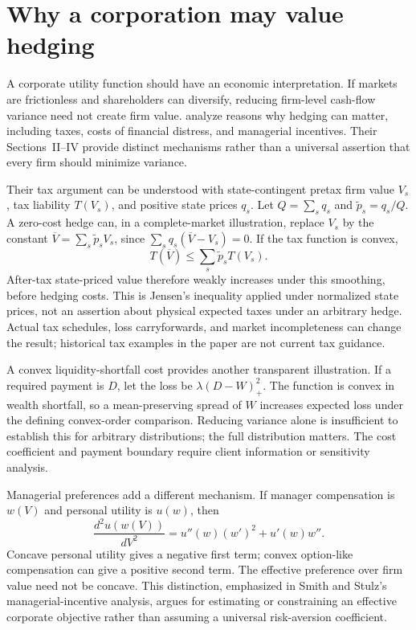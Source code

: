 \section{Why a corporation may value hedging}
A corporate utility function should have an economic interpretation. If markets are frictionless and shareholders can diversify, reducing firm-level cash-flow variance need not create firm value. \citet{smith1985} analyze reasons why hedging can matter, including taxes, costs of financial distress, and managerial incentives. Their Sections~II--IV provide distinct mechanisms rather than a universal assertion that every firm should minimize variance.

Their tax argument can be understood with state-contingent pretax firm value $V_s$, tax liability $T(V_s)$, and positive state prices $q_s$. Let $Q=\sum_s q_s$ and $\widetilde p_s=q_s/Q$. A zero-cost hedge can, in a complete-market illustration, replace $V_s$ by the constant $\overline V=\sum_s\widetilde p_sV_s$, since
$\sum_s q_s(\overline V-V_s)=0$. If the tax function is convex,
\begin{equation}
T(\overline V)\leq\sum_s\widetilde p_sT(V_s).
\end{equation}
After-tax state-priced value therefore weakly increases under this smoothing, before hedging costs. This is Jensen's inequality applied under normalized state prices, not an assertion about physical expected taxes under an arbitrary hedge. Actual tax schedules, loss carryforwards, and market incompleteness can change the result; historical tax examples in the paper are not current tax guidance.

A convex liquidity-shortfall cost provides another transparent illustration. If a required payment is $D$, let the loss be $\lambda(D-W)_+^2$. The function is convex in wealth shortfall, so a mean-preserving spread of $W$ increases expected loss under the defining convex-order comparison. Reducing variance alone is insufficient to establish this for arbitrary distributions; the full distribution matters. The cost coefficient and payment boundary require client information or sensitivity analysis.

Managerial preferences add a different mechanism. If manager compensation is $w(V)$ and personal utility is $u(w)$, then
\begin{equation}
\frac{d^2u(w(V))}{dV^2}=u''(w)(w')^2+u'(w)w''.
\end{equation}
Concave personal utility gives a negative first term; convex option-like compensation can give a positive second term. The effective preference over firm value need not be concave. This distinction, emphasized in Smith and Stulz's managerial-incentive analysis, argues for estimating or constraining an effective corporate objective rather than assuming a universal risk-aversion coefficient.

